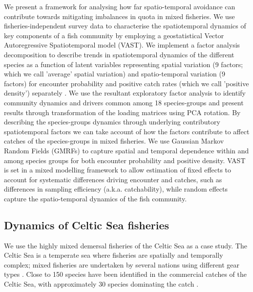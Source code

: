 \documentclass{nature}
\begin{document}
\begin{linenumbers}
We present a framework for analysing how far spatio-temporal avoidance can
contribute towards mitigating imbalances in quota in mixed fisheries. We use
fisheries-independent survey data to characterise the spatiotemporal dynamics
of key components of a fish community by employing a geostatistical Vector
Autoregressive Spatiotemporal model (VAST). We implement a factor analysis
decomposition to describe trends in spatiotemporal dynamics of the different
species as a function of latent variables \cite{Thorson2015} representing
spatial variation (9 factors; which we call 'average' spatial variation) and
spatio-temporal variation (9 factors) for encounter probability and positive
catch rates (which we call 'positive density') separately \cite{Thorson2015a}.
We use the resultant exploratory factor analysis to identify community dynamics
and drivers common among 18 species-groups and present results through
transformation of the loading matrices using PCA rotation. By describing the
species-groups dynamics through underlying contributory spatiotemporal factors
we can take account of how the factors contribute to affect catches of the
species-groups in mixed fisheries. We use Gaussian Markov Random Fields (GMRFs)
to capture spatial and temporal dependence within and among species groups for
both encounter probability and positive density\cite{Thorson2013}. VAST is set
in a mixed modelling framework to allow estimation of fixed effects to account
for systematic differences driving encounter and catches, such as differences
in sampling efficiency (a.k.a.  catchability), while random effects capture the
spatio-temporal dynamics of the fish community.

\subsection{Dynamics of Celtic Sea fisheries}

We use the highly mixed demersal fisheries of the Celtic Sea as a case study.
The Celtic Sea is a temperate sea where fisheries are spatially and temporally
complex; mixed fisheries are undertaken by several nations using different gear
types \cite{Ellis2000, Gerritsen2012}. Close to 150 species have been
identified in the commercial catches of the Celtic Sea, with approximately 30
species dominating the catch \cite{Mateo2016}.


\end{linenumbers}
\end{document}
